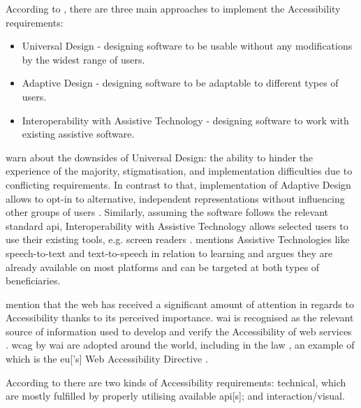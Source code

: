 According to \textcite[p. 296]{Wegge_Zimmermann_2007}, there are three main approaches to implement the Accessibility requirements:

\begin{itemize}
    \item Universal Design - designing software to be usable without any modifications by the widest range of users.
    \item Adaptive Design - designing software to be adaptable to different types of users.
    \item Interoperability with Assistive Technology - designing software to work with existing assistive software.
\end{itemize}

\textcite{Wegge_Zimmermann_2007} warn about the downsides of Universal Design: the ability to hinder the experience of the majority, stigmatisation, and implementation difficulties due to conflicting requirements.
In contrast to that, implementation of Adaptive Design allows to opt-in to alternative, independent representations without influencing other groups of users \parencite{Wegge_Zimmermann_2007}.
Similarly, assuming the software follows the relevant standard \gls{api}, Interoperability with Assistive Technology allows selected users to use their existing tools, e.g. screen readers \parencite{Wegge_Zimmermann_2007}.
\textcite{Edyburn_2021} mentions Assistive Technologies like speech-to-text and text-to-speech in relation to learning and argues they are already available on most platforms and can be targeted at both types of beneficiaries.

\textcite{Juergen_et_all_2020} mention that the web has received a significant amount of attention in regards to Accessibility thanks to its perceived importance.
\gls{wai} is recognised as the relevant source of information used to develop and verify the Accessibility of web services \parencite{WAI_Intro}.
\gls{wcag} by \gls{wai} are adopted around the world, including in the law \parencite{WAI_Policies}, an example of which is the \gls{eu}['s] Web Accessibility Directive \parencite{EU_Web_Accessibility}.


According to \parencite{WAI_Topics} there are two kinds of Accessibility requirements: technical, which are mostly fulfilled by properly utilising available \gls{api}[s]; and interaction/visual.

